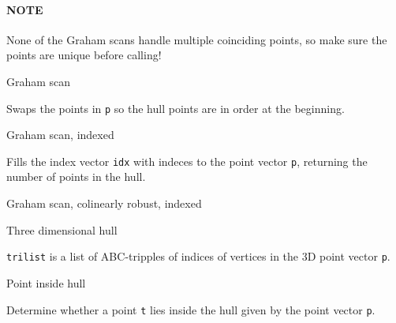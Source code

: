 
\paragraph{NOTE} None of the Graham scans handle multiple coinciding points,
so make sure the points are unique before calling!

\begin{algorithm}{Graham scan}

Swaps the points in {\tt p} so the hull points are in order at the beginning.
\end{algorithm}

\begin{algorithm}{Graham scan, indexed}

Fills the index vector {\tt idx} with indeces to the point vector {\tt p},
returning the number of points in the hull.
\end{algorithm}

\begin{algorithm}{Graham scan, colinearly robust, indexed}

\end{algorithm}

\begin{algorithm}{Three dimensional hull}


{\tt trilist} is a list of ABC-tripples of indices of vertices in the 3D
point vector {\tt p}.
\end{algorithm}

\begin{algorithm}{Point inside hull}

Determine whether a point {\tt t} lies inside the hull given by the
point vector {\tt p}.
\end{algorithm}

